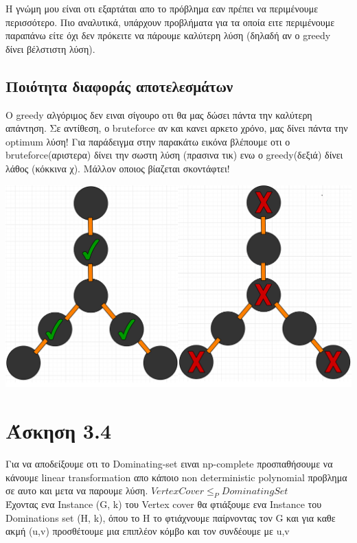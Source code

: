 \documentclass[12pt]{article}
\begin{document}
Η γνώμη μου είναι οτι εξαρτάται απο το πρόβλημα εαν πρέπει να περιμένουμε περισσότερο. 
Πιο αναλυτικά, υπάρχουν προβλήματα για τα οποία ειτε περιμένουμε παραπάνω είτε όχι δεν πρόκειτε να πάρουμε καλύτερη λύση (δηλαδή αν ο greedy δίνει βέλστιστη λύση).


\subsection{Ποιότητα διαφοράς αποτελεσμάτων}
Ο greedy αλγόριμος δεν ειναι σίγουρο οτι θα μας δώσει πάντα την καλύτερη απάντηση. Σε αντίθεση, ο bruteforce αν και κανει αρκετο χρόνο, μας δίνει πάντα την optimum λύση!
Για παράδειγμα στην παρακάτω εικόνα βλέπουμε οτι ο bruteforce(αριστερα) δίνει την σωστη λύση (πρασινα τικ) ενω ο greedy(δεξιά) δίνει λάθος (κόκκινα χ). Μάλλον οποιος βίαζεται σκοντάφτει!

 \begin{center}
	\includegraphics[scale = 0.4]{example.png}
 \end{center}


\newpage
\section{Άσκηση 3.4}

Για να αποδείξουμε οτι το Dominating-set ειναι np-complete προσπαθήσουμε να κάνουμε linear transformation απο κάποιο non deterministic polynomial προβλημα σε αυτο και μετα να παρουμε λύση. $VertexCover\le_P DominatingSet$ \\

Έχοντας ενα Instance (G, k) του Vertex cover θα φτιάξουμε ενα Instance του Dominations set (H, k), όπου το H το φτιάχνουμε παίρνοντας τον G και για καθε ακμή (u,v) προσθέτουμε μια επιπλέον κόμβο και τον συνδέουμε με u,v
\end{document}
